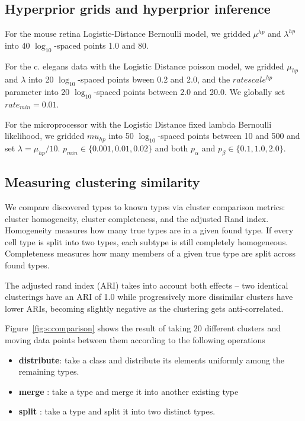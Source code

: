 \documentclass{article}
\begin{document}
\subsection*{Hyperprior grids and hyperprior inference}
\label{supp:hyperpriors}

For the mouse retina Logistic-Distance Bernoulli model, we gridded
$\mu^{hp}$ and $\lambda^{hp}$ into 40 $\log_{10}$-spaced points 1.0
and 80. 

For the c. elegans data with the Logistic Distance poisson model, we
gridded $\mu_{hp}$ and $\lambda$ into 20 $\log_{10}$-spaced points
bween 0.2 and 2.0, and the $ratescale^{hp}$ parameter into 20
$\log_{10}$-spaced points between 2.0 and 20.0. We globally set
$rate_{min}=0.01$.

For the microprocessor with the Logistic Distance fixed lambda
Bernoulli likelihood, we gridded $mu_{hp}$ into 50 $\log_{10}$-spaced
points between 10 and 500 and set $\lambda=\mu_{hp}/10$. $p_{min} \in
\{0.001, 0.01, 0.02\}$ and both $p_\alpha$ and $p_\beta \in \{0.1,
1.0, 2.0\}$.

\subsection*{Measuring clustering similarity}
We compare discovered types to known types via cluster comparison
metrics: cluster homogeneity, cluster completeness, and the adjusted
Rand index. Homogeneity measures how many true types are in a given
found type. If every cell type is split into two types, each subtype
is still completely homogeneous. Completeness measures how many
members of a given true type are split across found types.

The adjusted rand index (ARI) takes into account both effects
\autocite{Hubert1985} -- two identical clusterings have an ARI of 1.0
while progressively more dissimilar clusters have lower ARIs, becoming
slightly negative as the clustering gets anti-correlated.

Figure~\ref{fig:s:comparison} shows the result of taking 20 different clusters
and moving data points between them according to the following operations
\begin{itemize}
\item \textbf{distribute}: take a class and distribute its elements
  uniformly among the remaining types.
\item \textbf{merge} : take a type and merge it into another existing
  type
\item \textbf{split} : take a type and split it into two distinct
  types.
\end{itemize}
\end{document}
